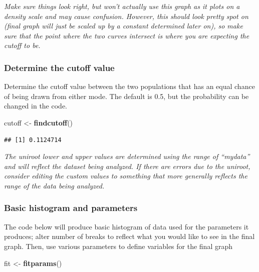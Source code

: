 \documentclass[
]{article}
\newenvironment{Shaded}{\begin{snugshade}}{\end{snugshade}}
\newcommand{\FunctionTok}[1]{\textcolor[rgb]{0.13,0.29,0.53}{\textbf{#1}}}
\newcommand{\NormalTok}[1]{#1}
\newcommand{\OtherTok}[1]{\textcolor[rgb]{0.56,0.35,0.01}{#1}}
\begin{document}
\emph{Make sure things look right, but won't actually use this graph as
it plots on a density scale and may cause confusion. However, this
should look pretty spot on (final graph will just be scaled up by a
constant determined later on), so make sure that the point where the two
curves intersect is where you are expecting the cutoff to be.}

\subsubsection{Determine the cutoff
value}\label{determine-the-cutoff-value}

Determine the cutoff value between the two populations that has an equal
chance of being drawn from either mode. The default is 0.5, but the
probability can be changed in the code.

\begin{Shaded}
\begin{Highlighting}[]
\NormalTok{cutoff }\OtherTok{\textless{}{-}} \FunctionTok{findcutoff}\NormalTok{()}
\end{Highlighting}
\end{Shaded}

\begin{verbatim}
## [1] 0.1124714
\end{verbatim}

\emph{The uniroot lower and upper values are determined using the range
of ``mydata'' and will reflect the dataset being analyzed. If there are
errors due to the uniroot, consider editing the custom values to
something that more generally reflects the range of the data being
analyzed.}

\subsubsection{Basic histogram and
parameters}\label{basic-histogram-and-parameters}

The code below will produce basic histogram of data used for the
parameters it produces; alter number of breaks to reflect what you would
like to see in the final graph. Then, use various parameters to define
variables for the final graph

\begin{Shaded}
\begin{Highlighting}[]
\NormalTok{fit }\OtherTok{\textless{}{-}} \FunctionTok{fitparams}\NormalTok{()}
\end{Highlighting}
\end{Shaded}
\end{document}
